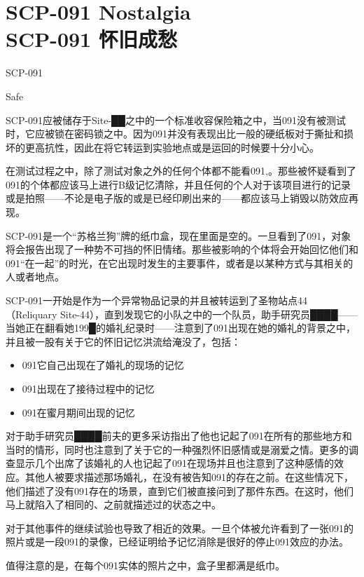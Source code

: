 \chapter[SCP-091 怀旧成愁]{
    SCP-091 Nostalgia\\
    SCP-091 怀旧成愁
}

\label{chap:SCP-091}

SCP-091

 Safe

SCP-091应被储存于Site-██之中的一个标准收容保险箱之中，当091没有被测试时，它应被锁在密码锁之中。因为091并没有表现出比一般的硬纸板对于撕扯和损坏的更高抗性，因此在将它转运到实验地点或是运回的时候要十分小心。

在测试过程之中，除了测试对象之外的任何个体都不能看091,。那些被怀疑看到了091的个体都应该马上进行B级记忆清除，并且任何的个人对于该项目进行的记录或是拍照——不论是电子版的或是已经印刷出来的——都应该马上销毁以防效应再现。

SCP-091是一个“苏格兰狗”牌的纸巾盒，现在里面是空的。一旦看到了091，对象将会报告出现了一种势不可挡的怀旧情绪。那些被影响的个体将会开始回忆他们和091“在一起”的时光，在它出现时发生的主要事件，或者是以某种方式与其相关的人或者地点。

SCP-091一开始是作为一个异常物品记录的并且被转运到了圣物站点44（Reliquary Site-44），直到发现它的小队之中的一个队员，助手研究员████——当她正在翻看她199█的婚礼纪录时——注意到了091出现在她的婚礼的背景之中，并且被一股有关于它的怀旧记忆洪流给淹没了，包括：

\begin{itemize}
\item 091它自己出现在了婚礼的现场的记忆
\item 091出现在了接待过程中的记忆
\item 091在蜜月期间出现的记忆
\end{itemize}

对于助手研究员████前夫的更多采访指出了他也记起了091在所有的那些地方和当时的情形，同时也注意到了关于它的一种强烈怀旧感情或是溺爱之情。更多的调查显示几个出席了该婚礼的人也记起了091在现场并且也注意到了这种感情的效应。其他人被要求描述那场婚礼，在没有被告知091的存在之前。在这些情况下，他们描述了没有091存在的场景，直到它们被直接问到了那件东西。在这时，他们马上就陷入了相同的、之前就描述过的状态之中。

对于其他事件的继续试验也导致了相近的效果。一旦个体被允许看到了一张091的照片或是一段091的录像，已经证明给予记忆消除是很好的停止091效应的办法。

值得注意的是，在每个091实体的照片之中，盒子里都满是纸巾。
